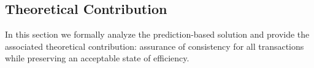\documentclass[conference]{IEEEtran}
\newtheorem{proposition}{Proposition}
\begin{document}
\subsection{Theoretical Contribution}
In this section we formally analyze the prediction-based solution and provide the associated theoretical contribution: assurance of consistency for all transactions while preserving an acceptable state of efficiency.




\end{document}
